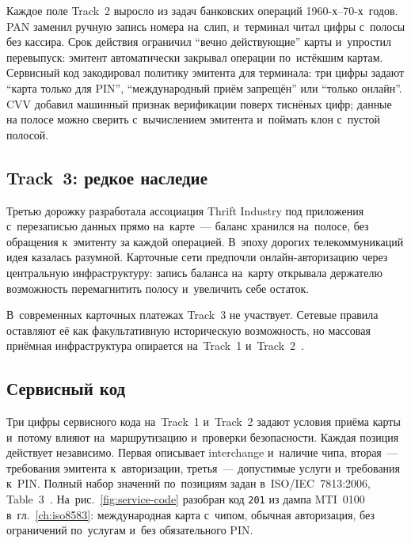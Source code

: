 Каждое поле Track~2 выросло из задач банковских операций 1960-х--70-х~годов.
PAN заменил ручную запись номера на~слип, и~терминал читал цифры с~полосы без
кассира. Срок действия ограничил \enquote{вечно действующие} карты и~упростил
перевыпуск: эмитент автоматически закрывал операции по~истёкшим картам.
Сервисный код закодировал политику эмитента для терминала: три цифры задают
\enquote{карта только для PIN}, \enquote{международный приём запрещён} или
\enquote{только онлайн}. CVV добавил машинный признак верификации поверх
тиснёных цифр; данные на полосе можно сверить с~вычислением эмитента и~поймать
клон с~пустой полосой.


\subsection*{Track~3: редкое наследие}

Третью дорожку разработала ассоциация Thrift Industry под приложения
с~перезаписью данных прямо на~карте~--- баланс хранился на~полосе, без
обращения к~эмитенту за каждой операцией. В~эпоху дорогих телекоммуникаций идея
казалась разумной. Карточные сети предпочли онлайн-авторизацию через
центральную инфраструктуру: запись баланса на~карту открывала держателю
возможность перемагнитить полосу и~увеличить себе остаток.

В~современных карточных платежах Track~3 не участвует. Сетевые правила
оставляют её как факультативную историческую возможность, но массовая приёмная
инфраструктура опирается на~Track~1
и~Track~2~\cite{iso-7813,mc-security-rules-2016}.

\subsection*{Сервисный код}

Три цифры сервисного кода на~Track~1 и~Track~2 задают условия приёма карты
и~потому влияют на~маршрутизацию и~проверки безопасности. Каждая позиция
действует независимо. Первая описывает interchange и~наличие чипа, вторая~---
требования эмитента к~авторизации, третья~--- допустимые услуги и~требования
к~PIN. Полный набор значений по~позициям задан в~ISO/IEC~7813:2006,
Table~3~\cite{iso-7813}. На~рис.~\ref{fig:service-code} разобран код
\texttt{201} из дампа MTI~0100 в~гл.~\ref{ch:iso8583}: международная карта
с~чипом, обычная авторизация, без ограничений по~услугам и~без обязательного
PIN.

